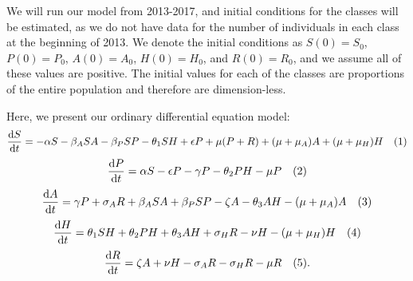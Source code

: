 \documentclass[12pt]{article}
\begin{document}
We will run our model from 2013-2017, and initial conditions for the classes will be estimated, as we do not have data for the number of individuals in each class at the beginning of 2013.  
We denote the initial conditions as
$S(0)=S_{0}$, $P(0)=P_{0}$, $A(0)=A_{0}$, $H(0)=H_{0}$, and $R(0)=R_{0}$, and we assume all of these values are positive. The initial values for each of the classes are proportions of the entire population and therefore are dimension-less.

 
Here, we present our ordinary differential equation model: %
\[\dv{S}{t} = -\alpha S - \beta_{A} SA  -\beta_{P} SP- \theta_{1} SH +\epsilon P +\mu (P+R) + (\mu+\mu_{A})A + (\mu+\mu_{H}) H \quad (1)\] 
\[\dv{P}{t} = \alpha S - \epsilon P  - \gamma P - \theta_{2}PH- \mu P    \quad(2)\]
\[\dv{A}{t} = \gamma P + \sigma_{A} R +\beta_{A} SA  +\beta_{P} SP -\zeta A - \theta_{3}AH-(\mu + \mu_{A})A   \quad (3)\]
\[\dv{H}{t} = \theta_{1}SH+\theta_{2}PH+\theta_{3}AH + \sigma_{H}R-\nu H-(\mu+\mu_{H})H  \quad (4)\]
\[\dv{R}{t} = \zeta A +\nu H -\sigma_{A}R-\sigma_{H}R -\mu R\quad(5).\]
\end{document}
